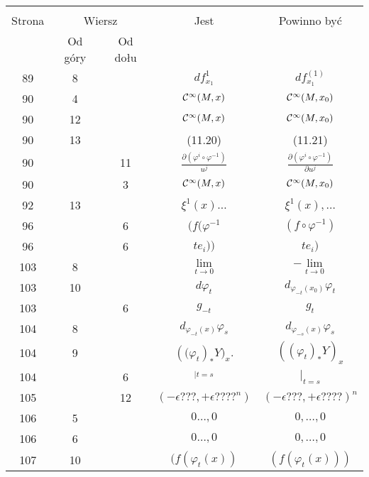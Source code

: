 \documentclass[a4paper,11pt]{article}
\begin{document}
\begin{center}
  \begin{tabular}{|c|c|c|c|c|}
    \hline
    & \multicolumn{2}{c|}{} & & \\
    Strona & \multicolumn{2}{c|}{Wiersz} & Jest
                              & Powinno być \\ \cline{2-3}
    & Od góry & Od dołu & & \\
    \hline
    89  &  8 & & $d f_{ x_{ 1 } }^{ 1 }$ & $d f_{ x_{ 1 } }^{ ( 1 ) }$ \\
    90  &  4 & & $\mathcal{C}^{ \infty }( M, x )$ & $\mathcal{C}^{ \infty }( M, x_{ 0 } )$ \\
    90  & 12 & & $\mathcal{C}^{ \infty }( M, x )$
           & $\mathcal{C}^{ \infty }( M, x_{ 0 } )$ \\
    90  & 13 & & (11.20) & (11.21) \\[0.3em]
    90  & & 11 & $\frac{ \partial ( \varphi^{ i } \circ \varphi^{ -1 } ) }{ u^{ j } }$
           & $\frac{ \partial ( \varphi^{ i } \circ \varphi^{ -1 } ) }{ \partial u^{ j } }$ \\[0.3em]
    90  & &  3 & $\mathcal{C}^{ \infty }( M, x )$
           & $\mathcal{C}^{ \infty }( M, x_{ 0 } )$ \\
    92  & 13 & & $\xi^{ 1 }( x ) \ldots$ & $\xi^{ 1 }( x ), \ldots$ \\
    96  & &  6 & $( f ( \varphi^{ -1 }$ & $( f \circ \varphi^{ -1 } )$ \\
    96  & &  6 & $t e_{ i } ))$ & $t e_{ i } )$ \\
    103 &  8 & & $\lim\limits_{ t \to 0 }$
           & $-\lim\limits_{ t \to 0 }$ \\
    103 & 10 & & $d \varphi_{ t }$ & $d_{ \varphi_{ -t }( x_{ 0 } ) } \varphi_{ t }$ \\
    103 & & 6 & $g_{ -t }$ & $g_{ t }$ \\
    104 &  8 & & $d_{ \varphi_{ -t }( x ) } \varphi_{ s }$
           & $d_{ \varphi_{ -s }( x ) } \varphi_{ s }$ \\
    104 &  9 & & $( \big( \varphi_{ t } )_{*} Y \big)_{ x }$.
           & $( ( \varphi_{ t } )_{ * } Y )_{ x }$ \\
    104 & &  6 & $_{ | t = s }$ & $|_{ t = s }$ \\
    105 & & 12 & $( - \epsilon???, + \epsilon????^{ n } )$ & $( -\epsilon???, +\epsilon???? )^{ n }$ \\
    106 &  5 & & $0\ldots, 0$ & $0, \ldots, 0$ \\
    106 &  6 & & $0\ldots, 0$ & $0, \ldots, 0$ \\
    107 & 10 & & $( f( \varphi_{ t }( x ) )$ & $( f( \varphi_{ t }( x ) ) )$ \\

\end{tabular}
\end{center}
\end{document}
